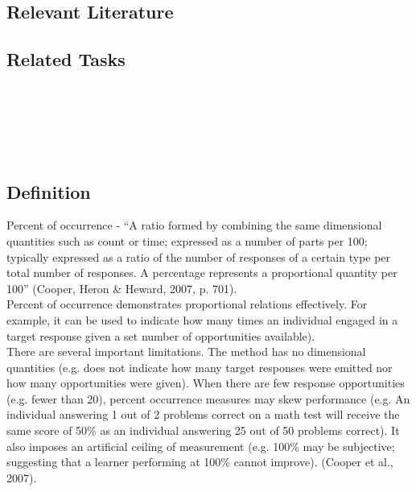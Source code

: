 \subsection{Relevant Literature}
\begin{refsection}
\nocite{test,alang2017police,clayton2018black}
\printbibliography[heading=none]
\end{refsection}
%
\subsection{Related Tasks}
\fouraFive{}\\
\fouriOne{}\\
\fourhOne{}\\
\fourFKFourtySeven{}\\
%
%
%
%
\section{\fouraSix{}}
\subsection{Definition}
Percent of occurrence - ``A ratio formed by combining the same dimensional quantities such as count or time; expressed as a number of parts per 100; typically expressed as a ratio of the number of responses of a certain type per total number of responses. A percentage represents a proportional quantity per 100'' (Cooper, Heron \& Heward, 2007, p. 701).\\

Percent of occurrence demonstrates proportional relations effectively. For example, it can be used to indicate how many times an individual engaged in a target response given a set number of opportunities available).\\

There are several important limitations. The method has no dimensional quantities (e.g. does not indicate how many target responses were emitted nor how many opportunities were given). When there are few response opportunities (e.g. fewer than 20), percent occurrence measures may skew performance (e.g. An individual  answering 1 out of 2 problems correct on a math test will receive the same score of 50\% as an individual answering 25 out of 50 problems correct). It also imposes an artificial ceiling of measurement (e.g. 100\% may be subjective; suggesting that a learner performing at 100\% cannot improve). (Cooper et al., 2007).

